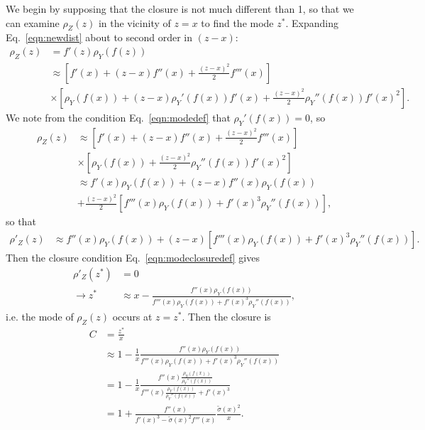 We begin by supposing that the closure is not much different than 1, so that we can examine $\rho_Z(z)$ in the vicinity of $z=x$ to find the mode $z^*$. Expanding Eq.~\ref{eqn:newdist} about to second order in $(z-x)$:
\begin{align}
\rho_Z(z) &= f'(z)\rho_Y(f(z))\nonumber\\
&\approx \left[f'(x)+(z-x)f''(x)+\frac{(z-x)^2}{2}f'''(x)\right]\nonumber\\
&\times\left[\rho_Y(f(x))+(z-x)\rho_Y'(f(x))f'(x)+\frac{(z-x)^2}{2}\rho_Y''(f(x))f'(x)^2\right].
\end{align}
We note from the condition Eq.~\ref{eqn:modedef} that $\rho_Y'(f(x))=0$, so
\begin{align}
\rho_Z(z)&\approx \left[f'(x)+(z-x)f''(x)+\frac{(z-x)^2}{2}f'''(x)\right]\nonumber\\
&\times\left[\rho_Y(f(x))+\frac{(z-x)^2}{2}\rho_Y''(f(x))f'(x)^2\right]\nonumber\\
&\approx f'(x)\rho_Y(f(x))+(z-x)f''(x)\rho_Y(f(x))\nonumber\\
&+\frac{(z-x)^2}{2}\left[f'''(x)\rho_Y(f(x))+f'(x)^3\rho_Y''(f(x))\right],
\end{align}
so that
\begin{align}
\rho'_Z(z)&\approx f''(x)\rho_Y(f(x))+(z-x)\left[f'''(x)\rho_Y(f(x))+f'(x)^3\rho_Y''(f(x))\right].
\label{eqn:drhoz}
\end{align}
Then the closure condition Eq.~\ref{eqn:modeclosuredef} gives
\begin{align}
\rho'_Z(z^*)&=0\nonumber\\
\rightarrow z^* &\approx x-\frac{f''(x)\rho_Y(f(x))}{f'''(x)\rho_Y(f(x))+f'(x)^3\rho_Y''(f(x))},
\end{align}
i.e. the mode of $\rho_Z(z)$ occurs at $z=z^*$.  Then the closure is
\begin{align}
C &= \frac{z^*}{x}\nonumber\\
&\approx 1-\frac{1}{x}\frac{f''(x)\rho_Y(f(x))}{f'''(x)\rho_Y(f(x))+f'(x)^3\rho_Y''(f(x))}\nonumber\\
&=1-\frac{1}{x}\frac{f''(x)\frac{\rho_Y(f(x))}{\rho_Y''(f(x))}}{f'''(x)\frac{\rho_Y(f(x))}{\rho_Y''(f(x))}+f'(x)^3}\nonumber\\
&=1+\frac{f''(x)}{f'(x)^3-\tilde{\sigma}(x)^2f'''(x)}\frac{\tilde{\sigma}(x)^2}{x}.
\label{eqn:mode_closure_df3}
\end{align}


